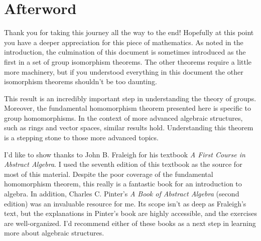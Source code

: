 \section*{Afterword}
\markright{}

Thank you for taking this journey all the way to the end! Hopefully at this point you have a deeper appreciation for this piece of mathematics. As noted in the introduction, the culmination of this document is sometimes introduced as the first in a set of group isomorphism theorems. The other theorems require a little more machinery, but if you understood everything in this document the other isomorphism theorems shouldn't be too daunting.

This result is an incredibly important step in understanding the theory of groups. Moreover, the fundamental homomorphism theorem presented here is specific to group homomorphisms. In the context of more advanced algebraic structures, such as rings and vector spaces, similar results hold. Understanding this theorem is a stepping stone to those more advanced topics.

I'd like to show thanks to John B. Fraleigh for his textbook \textit{A First Course in Abstract Algebra}. I used the seventh edition of this textbook as the source for most of this material. Despite the poor coverage of the fundamental homomorphism theorem, this really is a fantastic book for an introduction to algebra. In addition, Charles C. Pinter's \textit{A Book of Abstract Algebra} (second edition) was an invaluable resource for me. Its scope isn't as deep as Fraleigh's text, but the explanations in Pinter's book are highly accessible, and the exercises are well-organized. I'd recommend either of these books as a next step in learning more about algebraic structures.